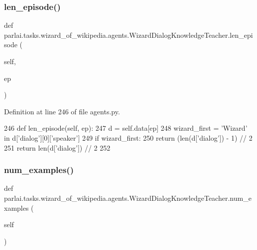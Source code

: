 \subsubsection{\texorpdfstring{len\+\_\+episode()}{len\_episode()}}
{\footnotesize\ttfamily def parlai.\+tasks.\+wizard\+\_\+of\+\_\+wikipedia.\+agents.\+Wizard\+Dialog\+Knowledge\+Teacher.\+len\+\_\+episode (\begin{DoxyParamCaption}\item[{}]{self,  }\item[{}]{ep }\end{DoxyParamCaption})}



Definition at line 246 of file agents.\+py.


\begin{DoxyCode}
246     \textcolor{keyword}{def }len\_episode(self, ep):
247         d = self.data[ep]
248         wizard\_first = \textcolor{stringliteral}{'Wizard'} \textcolor{keywordflow}{in} d[\textcolor{stringliteral}{'dialog'}][0][\textcolor{stringliteral}{'speaker'}]
249         \textcolor{keywordflow}{if} wizard\_first:
250             \textcolor{keywordflow}{return} (len(d[\textcolor{stringliteral}{'dialog'}]) - 1) // 2
251         \textcolor{keywordflow}{return} len(d[\textcolor{stringliteral}{'dialog'}]) // 2
252 
\end{DoxyCode}
\mbox{\label{classparlai_1_1tasks_1_1wizard__of__wikipedia_1_1agents_1_1WizardDialogKnowledgeTeacher_ad196e2551898f2a9e8d24414631a87bf}} 
\subsubsection{\texorpdfstring{num\+\_\+examples()}{num\_examples()}}
{\footnotesize\ttfamily def parlai.\+tasks.\+wizard\+\_\+of\+\_\+wikipedia.\+agents.\+Wizard\+Dialog\+Knowledge\+Teacher.\+num\+\_\+examples (\begin{DoxyParamCaption}\item[{}]{self }\end{DoxyParamCaption})}



